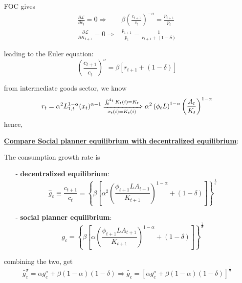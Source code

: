 \documentclass[10pt,landscape,a4paper]{article}
\begin{document}
\begin{multicols*}{3}
FOC gives
\begin{align*}
    \frac{\partial \mathcal{L}}{\partial c_t}=0\Rightarrow & \beta\left(\frac{c_{t+1}}{c_t}\right)^{-\sigma}=\frac{p_{t+1}}{p_t}\\
    \frac{\partial \mathcal{L}}{\partial K_{t+1}}=0\Rightarrow & \frac{p_{t+1}}{p_t} =  \frac{1}{r_{t+1}+(1-\delta)}
\end{align*}

leading to the Euler equation:
$$
\left(\frac{c_{t+1}}{c_t}\right)^{\sigma} = \beta\left[r_{t+1}+(1-\delta)\right]
$$

from intermediate goods sector, we know 
$$
r_t = \alpha^2 L_{1,t}^{1-\alpha}(x_t)^{\alpha-1} \xRightarrow[x_t(i)=K_t(i)]{\int^{A_t}_0 K_t(i)=K_t} \alpha^2 \left(\phi_t L\right)^{1-\alpha} \left(\frac{A_t}{K_t}\right)^{1-\alpha}
$$
hence,

\vspace{2pt}

\vspace{4pt}
\textbf{\color{myblue}\underline{Compare Social planner equilibrium with decentralized equilibrium}}:

The consumption growth rate is 
\begin{itemize}
    \item[-] \textbf{decentralized equilibrium}: 
    $$
    \hat{g}_c\equiv \frac{c_{t+1}}{c_t} = \left\{\beta\left[ \alpha^2 \left(\frac{\phi_{t+1}L A_{t+1}}{K_{t+1}}\right)^{1-\alpha}+(1-\delta) \right]\right\}^{\frac{1}{\sigma}}
    $$
    \item[-] \textbf{social planner equilibrium}:
    $$
    g_c =\left\{\beta\left[ \alpha \left(\frac{\phi_{t+1}L A_{t+1}}{K_{t+1}}\right)^{1-\alpha}+(1-\delta) \right]\right\}^{\frac{1}{\sigma}}
    $$
\end{itemize}
combining the two, get 
$$
\hat{g}_c^{\sigma} = \alpha g_c^{\sigma} +\beta(1-\alpha)(1-\delta)\Rightarrow \hat{g}_c = \left[ \alpha g_c^{\sigma} +\beta(1-\alpha)(1-\delta) \right]^{\frac{1}{\sigma}}
$$


\end{multicols*}
\end{document}
